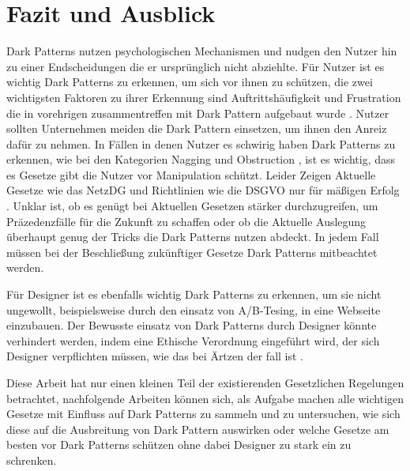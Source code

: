 \documentclass[conference,compsoc,final,a4paper]{IEEEtran}
\begin{document}
\section{Fazit und Ausblick}
Dark Patterns nutzen psychologischen Mechanismen und nudgen den Nutzer hin zu einer Endscheidungen die er ursprünglich nicht abziehlte. Für Nutzer ist es wichtig Dark Patterns zu erkennen, um sich vor ihnen zu schützen, die zwei wichtigsten Faktoren zu ihrer Erkennung sind Auftrittshäufigkeit und Frustration die in vorehrigen zusammentreffen mit Dark Pattern aufgebaut wurde \autocite{M.Bhoot2020}. Nutzer sollten Unternehmen meiden die Dark Pattern einsetzen, um ihnen den Anreiz dafür zu nehmen. In Fällen in denen Nutzer es schwirig haben Dark Patterns zu erkennen, wie bei den Kategorien Nagging und Obstruction \autocites{Gray_2018}{M.Bhoot2020}, ist es wichtig, dass es Gesetze gibt die Nutzer vor Manipulation schützt. Leider Zeigen Aktuelle Gesetze wie das \ac{NetzDG} und Richtlinien wie die \ac{DSGVO} nur für mäßigen Erfolg \autocites{Nouwens2020}{Soe2020}. Unklar ist, ob es genügt bei Aktuellen Gesetzen stärker durchzugreifen, um Präzedenzfälle für die Zukunft zu schaffen \autocite{Rieger2020} oder ob die Aktuelle Auslegung überhaupt genug der Tricks die Dark Patterns nutzen abdeckt. In jedem Fall müssen bei der Beschließung zukünftiger Gesetze Dark Patterns mitbeachtet werden.

Für Designer ist es ebenfalls wichtig Dark Patterns zu erkennen, um sie nicht ungewollt, beispielsweise durch den einsatz von A/B-Tesing, in eine Webseite einzubauen. Der Bewusste einsatz von Dark Patterns durch Designer könnte verhindert werden, indem eine Ethische Verordnung eingeführt wird, der sich Designer verpflichten müssen, wie das bei Ärtzen der fall ist \autocite{Gray_2018}.

Diese Arbeit hat nur einen kleinen Teil der existierenden Gesetzlichen Regelungen betrachtet, nachfolgende Arbeiten können sich, als Aufgabe machen alle wichtigen Gesetze mit Einfluss auf Dark Patterns zu sammeln und zu untersuchen, wie sich diese auf die Ausbreitung von Dark Pattern auswirken oder welche Gesetze am besten vor Dark Patterns schützen ohne dabei Designer zu stark ein zu schrenken. 


\end{document}
